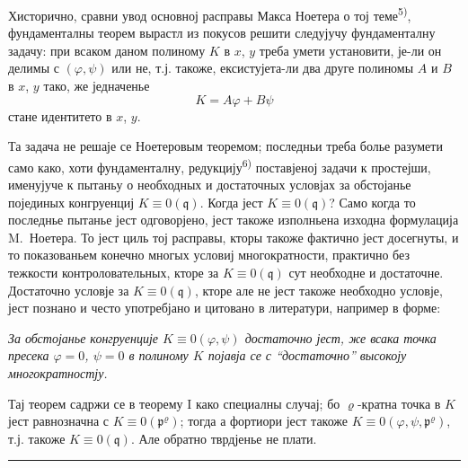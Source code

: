\documentclass[11pt]{article}
\theoremstyle{plain}
\begin{document}
Хисторично, сравни увод основној расправы Макса Ноетера о тој
теме\textsuperscript{5)}, фундаменталны теорем вырастл из покусов
решити следујучу фундаменталну задачу: при всаком даном полиному
$K$ в $x$, $y$ треба умети установити, је-ли он делимы с
$(\varphi, \psi)$ или не, т.ј. такоже, ексистујета-ли два друге
полиномы $A$ и $B$ в $x$, $y$ тако, же једначенье
\[
K = A\varphi + B\psi
\]
стане идентитето в $x$, $y$.

Та задача не решаје се Ноетеровым теоремом; последньи треба болье
разумети само како, хоти фундаменталну, редукцију\textsuperscript{6)}
поставјеној задачи к простејши, именујуче к пытаньу о необходных и
достаточных условјах за обстојанье појединых конгруенциј
$K \equiv 0(\mathfrak{q})$. Когда јест $K \equiv 0(\mathfrak{q})$?
Само когда то последнье пытанье јест одговорјено, јест такоже
изполньена изходна формулација M.\ Ноетера. То јест циль тој
расправы, кторы такоже фактично јест досегнуты, и то показованьем
конечно многых условиј многократности, практично без тежкости
контроловательных, кторе за $K \equiv 0(\mathfrak{q})$ сут
необходне и достаточне. Достаточно условје за
$K \equiv 0(\mathfrak{q})$, кторе але не јест такоже необходно
условје, јест познано и често употребјано и цитовано в литератури,
например в форме:

\smallskip
\textit{За обстојанье конгруенције $K \equiv 0(\varphi, \psi)$
достаточно јест, же всака точка пресека $\varphi = 0$, $\psi = 0$
в полиному $K$ појавја се с ``достаточно'' высокоју многократностју.}

\smallskip
Тај теорем садржи се в теорему I како специалны случај; бо
$\varrho$-кратна точка в $K$ јест равнозначна с
$K \equiv 0(\mathfrak{p}^{\varrho})$; тогда а фортиори јест такоже
$K \equiv 0(\varphi, \psi, \mathfrak{p}^{\varrho})$, т.ј. такоже
$K \equiv 0(\mathfrak{q})$. Але обратно тврдјенье не плати.

\vspace{0.5em}
\noindent\rule{\textwidth}{0.4pt}
\vspace{0.3em}
\end{document}
